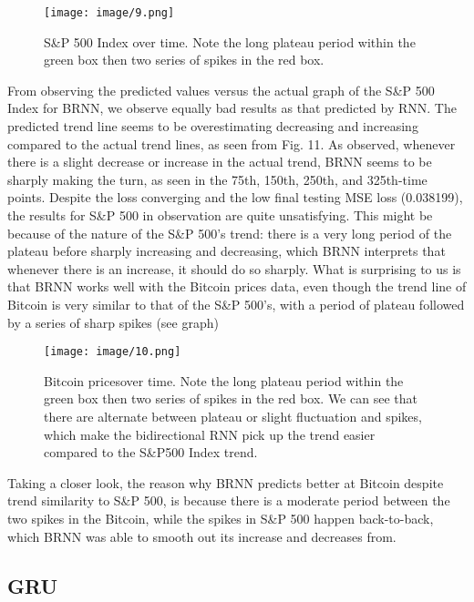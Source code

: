 \documentclass[letterpaper, 10 pt, conference]{ieeeconf}  %
\begin{document}
        \begin{figure}[thpb]
            \centering
            \texttt{[image: image/9.png]}
            \caption{S\&P 500 Index over time. Note the long plateau period within the green box then two series of spikes in the red box.}
            \label{figurelabel}
        \end{figure}

        From observing the predicted values versus the actual graph of the S\&P 500 Index for BRNN, we observe equally bad results as that predicted by RNN. The predicted trend line seems to be overestimating decreasing and increasing compared to the actual trend lines, as seen from Fig. 11. As observed, whenever there is a slight decrease or increase in the actual trend, BRNN seems to be sharply making the turn, as seen in the 75th, 150th, 250th, and 325th-time points. Despite the loss converging and the low final testing MSE loss (0.038199), the results for S\&P 500 in observation are quite unsatisfying. This might be because of the nature of the S\&P 500's trend: there is a very long period of the plateau before sharply increasing and decreasing, which BRNN interprets that whenever there is an increase, it should do so sharply. What is surprising to us is that BRNN works well with the Bitcoin prices data, even though the trend line of Bitcoin is very similar to that of the S\&P 500's, with a period of plateau followed by a series of sharp spikes (see graph)
        
        \begin{figure}[thpb]
            \centering
            \texttt{[image: image/10.png]}
            \caption{Bitcoin pricesover time. Note the long plateau period within the green box then two series of spikes in the red box. We can see that there are alternate between plateau or slight fluctuation and spikes, which make the bidirectional RNN pick up the trend easier compared to the S\&P500 Index trend.}
            \label{figurelabel}
        \end{figure}

        Taking a closer look, the reason why BRNN predicts better at Bitcoin despite trend similarity to S\&P 500, is because there is a moderate period between the two spikes in the Bitcoin, while the spikes in S\&P 500 happen back-to-back, which BRNN was able to smooth out its increase and decreases from.

    \subsection{GRU}
\end{document}
